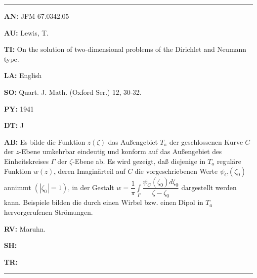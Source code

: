 \bigskip\par\noindent\hrule\bigskip\par

\item{\bf AN:} JFM 67.0342.05
\item{\bf AU:} Lewis, T.
\item{\bf TI:} On the solution of two-dimensional problems of the Dirichlet
and Neumann type.
\item{\bf LA:} English
\item{\bf SO:} Quart. J. Math. (Oxford Ser.) 12, 30-32.
\item{\bf PY:} 1941
\item{\bf DT:} J
\item{\bf AB:}{\parindent15pt
 Es bilde die Funktion $z (\zeta)$ das Au{\ss}engebiet $T_a$ der geschlossenen
Kurve $C$
der $z$-Ebene umkehrbar eindeutig und konform auf das Au{\ss}engebiet des
Einheitskreises $\varGamma$ der
$\zeta$-Ebene ab. Es wird gezeigt, da{\ss} diejenige in $T_a$ regul\"are
Funktion
$w(z)$, deren Imagin\"arteil
auf $C$ die vorgeschriebenen Werte $\psi_C (\zeta_0)$ annimmt $(|\zeta_0| = 1)$,
in der Gestalt
$w=\dfrac1\pi\int\limits_\varGamma\dfrac{\psi_C(\zeta_0)d\zeta_0}{\zeta-\zeta_0}$
dargestellt werden kann. Beispiele bilden die
durch einen Wirbel bzw. einen Dipol in $T_a$ hervorgerufenen Str\"omungen.
}
\item{\bf RV:} Maruhn.
\item{\bf SH:}
\item{\bf TR:}

\bigskip\par\noindent\hrule\bigskip\par

